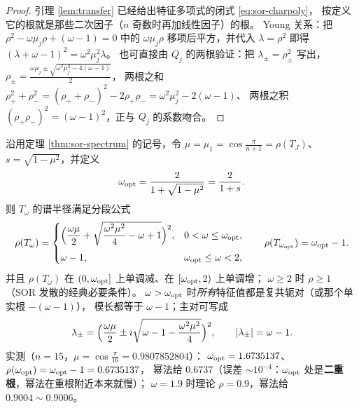 \begin{proof}
引理 \ref{lem:transfer} 已经给出特征多项式的闭式 \eqref{eq:sor-charpoly}，
按定义它的根就是那些二次因子（$n$ 奇数时再加线性因子）的根。
Young 关系：把 $\rho^2-\omega\mu_j\rho+(\omega-1)=0$ 中的
$\omega\mu_j\rho$ 移项后平方，并代入 $\lambda=\rho^2$ 即得
$(\lambda+\omega-1)^2=\omega^2\mu_j^2\lambda$。
也可直接由 $Q_j$ 的两根验证：把 $\lambda_\pm=\rho_\pm^2$ 写出，
$\rho_\pm=\frac{\omega\mu_j\pm\sqrt{\omega^2\mu_j^2-4(\omega-1)}}{2}$，
两根之和 $\rho_+^2+\rho_-^2=(\rho_++\rho_-)^2-2\rho_+\rho_-=\omega^2\mu_j^2-2(\omega-1)$、
两根之积 $(\rho_+\rho_-)^2=(\omega-1)^2$，正与 $Q_j$ 的系数吻合。
\end{proof}

\begin{theorem}[最优松弛因子与分段谱半径]
\label{thm:sor-opt}
沿用定理 \ref{thm:sor-spectrum} 的记号，令 $\mu=\mu_1=\cos\frac{\pi}{n+1}=\rho(T_J)$、
$s=\sqrt{1-\mu^2}$，并定义
\begin{equation}
  \omega_{\rm opt}=\frac{2}{1+\sqrt{1-\mu^2}}=\frac{2}{1+s}.
  \label{eq:omegaopt}
\end{equation}
则 $T_\omega$ 的谱半径满足分段公式
\begin{equation}
  \rho(T_\omega)=
  \begin{cases}
  \Bigl(\dfrac{\omega\mu}{2}+\sqrt{\dfrac{\omega^2\mu^2}{4}-\omega+1}\Bigr)^{2},
  & 0<\omega\le\omega_{\rm opt},\\[3mm]
  \omega-1, & \omega_{\rm opt}\le\omega<2,
  \end{cases}
  \qquad
  \rho(T_{\omega_{\rm opt}})=\omega_{\rm opt}-1 .
  \label{eq:sor-rho}
\end{equation}
并且 $\rho(T_\omega)$ 在 $(0,\omega_{\rm opt}]$ 上单调减、在 $[\omega_{\rm opt},2)$ 上单调增；
$\omega\ge2$ 时 $\rho\ge1$（SOR 发散的经典必要条件）。
$\omega>\omega_{\rm opt}$ 时\emph{所有}特征值都是复共轭对（或那个单实根 $-(\omega-1)$），
模长都等于 $\omega-1$；主对可写成
\begin{equation}
  \lambda_\pm=\Bigl(\frac{\omega\mu}{2}\pm i\sqrt{\omega-1-\frac{\omega^2\mu^2}{4}}\Bigr)^{2},
  \qquad |\lambda_\pm|=\omega-1 .
  \label{eq:sor-complex}
\end{equation}
实测（$n=15$，$\mu=\cos\frac{\pi}{16}=0.9807852804$）：
$\omega_{\rm opt}=1.6735137$、$\rho(\omega_{\rm opt})=\omega_{\rm opt}-1=0.6735137$，
幂法给 $0.6737$（误差 $\sim10^{-4}$：$\omega_{\rm opt}$ 处是\textbf{二重根}，幂法在重根附近本来就慢）；
$\omega=1.9$ 时理论 $\rho=0.9$，幂法给 $0.9004\sim0.9006$。
\end{theorem}

